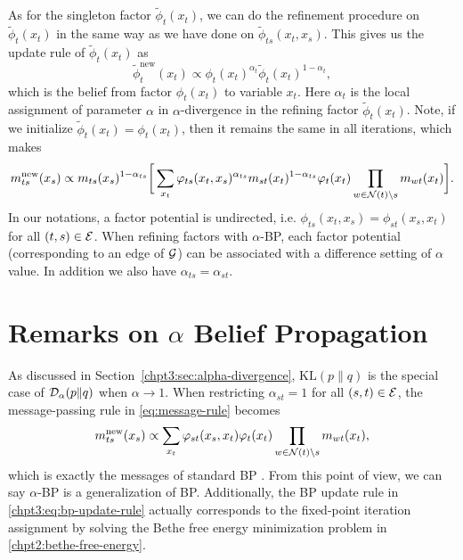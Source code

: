 As for the singleton factor $\tilde{\phi}_t(x_t)$, we can do the refinement procedure on $\tilde{\phi}_t(x_t)$ in the same way as we have done on $\tilde{\phi}_{ts}(x_t, x_s)$. This gives us the update rule of $\tilde{\phi}_t(x_t)$ as
\begin{equation}\label{eq:fix-factor-update}
  \tilde{\phi}_t^{\mathrm{new}}(x_t) \propto \phi_t(x_t)^{\alpha_{t}} \tilde{\phi}_t(x_t)^{1-\alpha_{t}},
\end{equation}
which is the belief from factor $\phi_t(x_t)$ to variable $x_t$. Here $\alpha_t$ is the local assignment of parameter $\alpha$ in $\alpha$-divergence in the refining factor $\tilde{\phi}_t(x_t)$. Note, if we initialize $\tilde{\phi}_t(x_t) = \phi_t(x_t)$, then it remains the same in all iterations, which makes
\begin{align}\label{eq:message-rule}
  {m}^{\mathrm{new}}_{ts}(x_s) \propto
  m_{ts}(x_s)^{1-\alpha_{ts}} \bigg[\sum_{x_t} \varphi_{ts}(x_t, x_s)^{\alpha_{ts}} {m}_{st}(x_t)^{1-\alpha_{ts}} {\varphi}_t(x_t) \prod_{w\in \mathcal{N}(t)\backslash s}m_{wt}(x_t) \bigg].
\end{align}
In our notations, a factor potential is undirected, i.e. $\phi_{ts}(x_t, x_s)=\phi_{st}(x_s, x_t)$ for all $(t,s) \in \mathcal{E}$. When refining factors with $\alpha$-BP, each factor potential (corresponding to an edge of $\mathcal{G}$) can be associated with a difference setting of $\alpha$ value. In addition we also have $\alpha_{ts} = \alpha_{st}$.

\section{Remarks on $\alpha$ Belief Propagation}\label{subsec:remark}

As discussed in Section~\ref{chpt3:sec:alpha-divergence}, $\mathrm{KL}(p\|q)$ is the special case of $\mathcal{D}_{\alpha}(p\|q)$ when $\alpha \rightarrow 1$. When restricting $\alpha_{st}=1$ for all $(s,t) \in \mathcal{E}$, the message-passing rule in \eqref{eq:message-rule} becomes
\begin{equation}\label{chpt3:eq:bp-update-rule}
  {m}^{\text{new}}_{ts}(x_s) \propto 
  \sum_{x_t} \varphi_{st}(x_s, x_t) {\varphi}_t(x_t) \prod_{w\in \mathcal{N}(t)\backslash s}m_{wt}(x_t),
\end{equation}
which is exactly the messages of standard BP \cite{Bishop:2006:PRM:1162264}. From this point of view, we can say $\alpha$-BP is a generalization of BP. Additionally, the BP update rule in \eqref{chpt3:eq:bp-update-rule} actually corresponds to the fixed-point iteration assignment by solving the Bethe free energy minimization problem in \eqref{chpt2:bethe-free-energy}.


